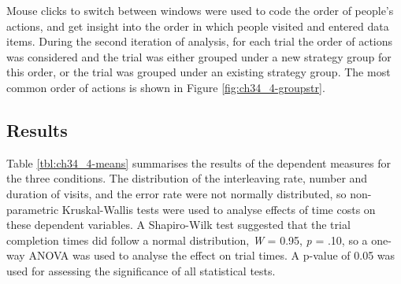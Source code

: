 Mouse clicks to switch between windows were used to code the order of people's actions, and get insight into the order in which people visited and entered data items. During the second iteration of analysis, for each trial the order of actions was considered and the trial was either grouped under a new strategy group for this order, or the trial was grouped under an existing strategy group. The most common order of actions is shown in Figure \ref{fig:ch34_4-groupstr}.

\subsection{Results}
Table \ref{tbl:ch34_4-means} summarises the results of the dependent measures for the three conditions. The distribution of the interleaving rate, number and duration of visits, and the error rate were not normally distributed, so non-parametric Kruskal-Wallis tests were used to analyse effects of time costs on these dependent variables. 
A Shapiro-Wilk test suggested that the trial completion times did follow a normal distribution, \textit{W} = 0.95, \textit{p} = .10, so a one-way ANOVA was used to analyse the effect on trial times. A p-value of 0.05 was used for assessing the significance of all statistical tests. 

